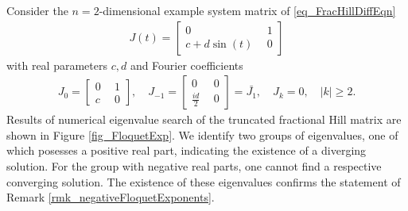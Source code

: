 \documentclass{svproc}
\begin{document}
		\begin{example}\label{ex_mathieu}
			Consider the $n=2$-dimensional example system matrix of \eqref{eq_FracHillDiffEqn}
			\begin{align} \label{eq_FracMathieu}
				J(t) = \begin{bmatrix}
					0~~& 1\\
					c+d\sin(t)~~& 0
				\end{bmatrix}
			\end{align}
			with real parameters $c,d$ and Fourier coefficients
			\begin{align}
				J_0 = \begin{bmatrix}
					0~~ & 1\\
					c~~ & 0
				\end{bmatrix},\quad
				J_{-1} = \begin{bmatrix}
				0~~ & 0\\
				\frac{id}{2}~~ & 0
				\end{bmatrix}=\bar{J_1},\quad J_k = 0,\quad |k|\geq 2.
			\end{align}
			Results of numerical eigenvalue search of the truncated fractional Hill matrix are shown in Figure \ref{fig_FloquetExp}. We identify two groups of eigenvalues, one of which posesses a positive real part, indicating the existence of a diverging solution. For the group with negative real parts, one cannot find a respective converging solution. The existence of these eigenvalues confirms the statement of Remark \ref{rmk_negativeFloquetExponents}.
		\end{example}
\end{document}
